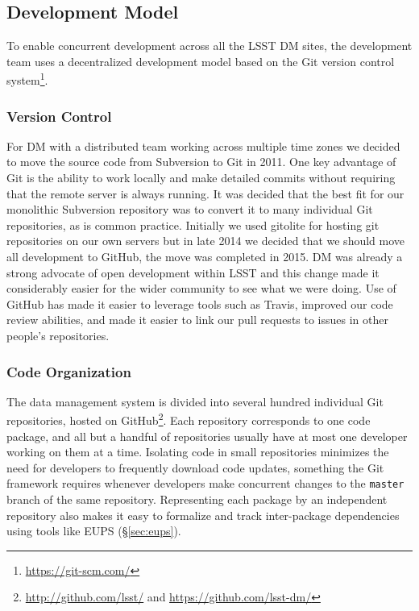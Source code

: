 \subsection{Development Model}\label{sec:development}

To enable concurrent development across all the LSST DM sites, the development team uses a decentralized development model based on the Git version control system\footnote{\url{https://git-scm.com/}}.

\subsubsection{Version Control}\label{sec:git}\label{sec:subversion}

For DM with a distributed team working across multiple time zones we decided to  move the  source code from Subversion to Git in 2011.
One key advantage of Git  is the ability to work locally and make detailed commits without requiring that the remote server is always running.
It was decided that the best fit for our monolithic Subversion repository was to convert it to many individual Git repositories, as is common practice.
Initially we used gitolite for hosting git repositories on our own servers but in late 2014 we decided that we should move all development to GitHub\cite{Document-17187}, the move was completed in 2015.
DM was already a strong advocate of open development within LSST and this change made it considerably easier for the wider community to see what we were doing.
Use of GitHub  has made it easier to leverage tools such as Travis, improved our code review abilities, and made it easier to link our pull requests to issues in other people's repositories.

\subsubsection{Code Organization}\label{sec:git_repositories}

The data management system is divided into several hundred individual Git repositories, hosted on GitHub\footnote{\url{http://github.com/lsst/} and \url{https://github.com/lsst-dm/}}.
Each repository corresponds to one code package, and all but a handful of repositories usually have at most one developer working on them at a time.
Isolating code in small repositories minimizes the need for developers to frequently download code updates, something the Git framework requires whenever developers make concurrent changes to the \texttt{master} branch of the same repository.
Representing each package by an independent repository also makes it easy to formalize and track inter-package dependencies using tools like EUPS (\S\ref{sec:eups}).

